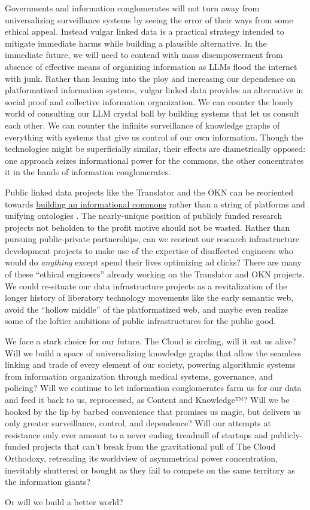 Governments and information conglomerates will not turn away from universalizing surveillance systems by seeing the error of their ways from some ethical appeal. Instead vulgar linked data is a practical strategy intended to mitigate immediate harms while building a plausible alternative. In the immediate future, we will need to contend with mass disempowerment from absence of effective means of organizing information as LLMs flood the internet with junk. Rather than leaning into the ploy and increasing our dependence on platformatized information systems, vulgar linked data provides an alternative in social proof and collective information organization. We can counter the lonely world of consulting our LLM crystal ball by building systems that let us consult each other. We can counter the infinite surveillance of knowledge graphs of everything with systems that give us control of our own information. Though the technologies might be superficially similar, their effects are diametrically opposed: one approach seizes informational power for the commons, the other concentrates it in the hands of information conglomerates.

Public linked data projects like the Translator and the OKN can be
reoriented towards
\href{https://jon-e.net/blog/2023/04/24/Re-NIH-RFI-OSTP-Memo/}{building
an informational commons} rather than a string of platforms and unifying
ontologies \cite{saundersReNIHRFI2023} . The nearly-unique
position of publicly funded research projects not beholden to the profit
motive should not be wasted. Rather than pursuing public-private
partnerships, can we reorient our research infrastructure development
projects to make use of the expertise of disaffected engineers who would
do \emph{anything} except spend their lives optimizing ad clicks? There
are many of these ``ethical engineers'' already working on the
Translator and OKN projects. We could re-situate our data infrastructure
projects as a revitalization of the longer history of liberatory
technology movements like the early semantic web, avoid the ``hollow
middle'' of the platformatized web, and maybe even realize some of the
loftier ambitions of public infrastructures for the public good.

We face a stark choice for our future. The Cloud is circling, will it
eat us alive? Will we build a space of universalizing knowledge graphs
that allow the seamless linking and trade of every element of our
society, powering algorithmic systems from information organization
through medical systems, governance, and policing? Will we continue to
let information conglomerates farm us for our data and feed it back to
us, reprocessed, as Content and Knowledge™? Will we be hooked by the lip
by barbed convenience that promises us magic, but delivers us only
greater surveillance, control, and dependence? Will our attempts at
resistance only ever amount to a never ending treadmill of startups and
publicly-funded projects that can't break from the gravitational pull of
The Cloud Orthodoxy, retreading its worldview of asymmetrical power
concentration, inevitably shuttered or bought as they fail to compete on
the same territory as the information giants?

Or will we build a better world?
